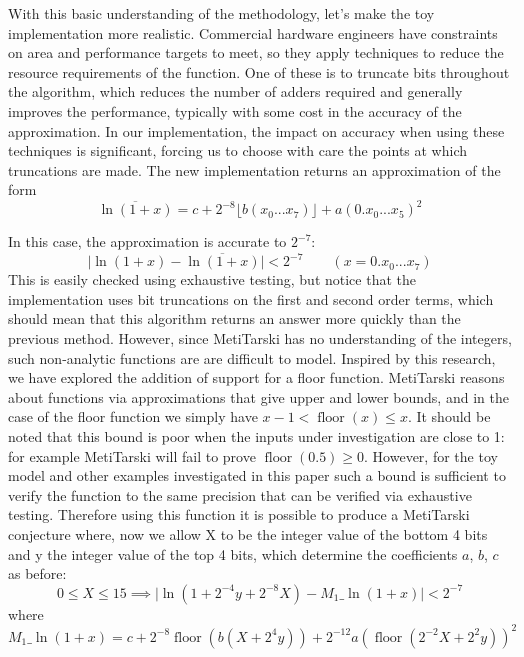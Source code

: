 \documentclass[a4]{article}
\newcommand{\abs}[1]{\lvert#1\rvert}
\newcommand{\floor}{\mathop{\textrm{floor}}\nolimits}
\begin{document}
With this basic understanding of the methodology, let's make the toy implementation more realistic. Commercial hardware engineers have constraints on area and performance targets to meet, so they apply techniques to reduce the resource requirements of the function. One of these is to truncate bits throughout the algorithm, which reduces the number of adders required and generally improves the performance, typically with some cost in the accuracy of the approximation. In our implementation, the impact on accuracy when using these techniques is significant, forcing us to choose with care the points at which truncations are made. The new implementation returns an approximation of the form 
$$ \overline{\ln(1+x)}=c + 2^{-8} \lfloor{b(x_0...x_7)} \rfloor +a(0.x_0...x_5)^2 $$

\noindent In this case, the approximation is accurate to $2^{-7}$: 
\[ 
\abs{\ln(1+x)-\overline{\ln(1+x)}} <2^{-7} \qquad (x= 0.x_0...x_7) \]
This is easily checked using exhaustive testing, but notice that the implementation uses bit truncations on the first and second order terms, which should mean that this algorithm returns an answer more quickly than the previous method. However, since MetiTarski has no understanding of the integers, such non-analytic functions are are difficult to model. Inspired by this research, we have explored the addition of support for a floor function. MetiTarski reasons about functions via approximations that give upper and lower bounds, and in the case of the floor function we simply have $x-1< \floor(x)\le x$. It should be noted that this bound is poor when the inputs under investigation are close to 1: for example MetiTarski will fail to prove $\floor(0.5)\geq 0$.
However, for the toy model and other examples investigated in this paper such a bound is sufficient to verify the function to the same precision that can be verified via exhaustive testing. Therefore using this function it is possible to produce a MetiTarski conjecture where, now we allow X to be the integer value of the bottom 4 bits and y the integer value of the top 4 bits, which determine the coefficients $a$, $b$, $c$ as before:
\[
0\le X \le 15 \implies \abs{\ln(1+2^{-4}y+2^{-8}X) - M_1\_\ln(1+x)} <2^{-7}
\]
where $$M_1\_\ln(1+x)=c+2^{-8}\floor(b(X+2^{4}y))+2^{-12}a(\floor(2^{-2}X+2^{2}y))^2$$
\end{document}
